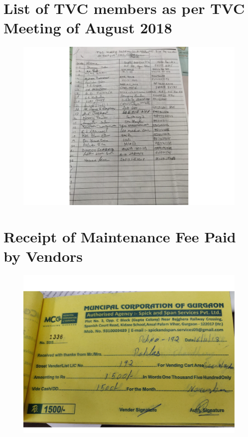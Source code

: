 \documentclass[a4paper, 12pt, twoside]{article}
\begin{document}
{{\section{List of TVC members as per TVC Meeting of August 2018}
\label{appendix: TVC members as per minutes}
\begin{figure}[h]
\centering
\includegraphics[width=7in]{ListofTVC.pdf}
\end{figure}

\newpage
\section{Receipt of Maintenance Fee Paid by Vendors}
\label{appendix: fee receipt}
\begin{figure}[h]
\centering
\includegraphics[width=6in]{Receipt1.pdf}
\end{figure}

}}
\end{document}
